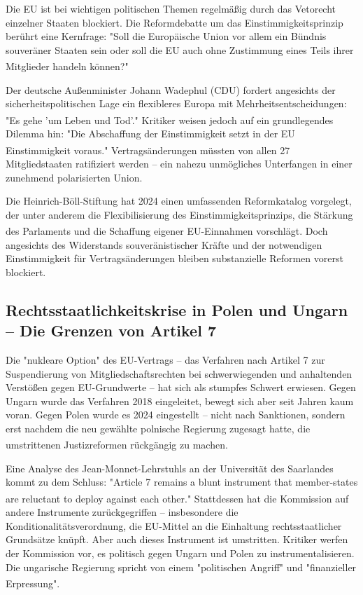 \documentclass[12pt,a4paper]{article}
\newcommand{\footcite}[1]{\textsuperscript{\cite{#1}}}
\begin{document}
	Die EU ist bei wichtigen politischen Themen regelmäßig durch das Vetorecht einzelner Staaten blockiert. Die Reformdebatte um das Einstimmigkeitsprinzip berührt eine Kernfrage: "Soll die Europäische Union vor allem ein Bündnis souveräner Staaten sein oder soll die EU auch ohne Zustimmung eines Teils ihrer Mitglieder handeln können?"\footcite{DLF2026}
	
	Der deutsche Außenminister Johann Wadephul (CDU) fordert angesichts der sicherheitspolitischen Lage ein flexibleres Europa mit Mehrheitsentscheidungen: "Es gehe 'um Leben und Tod'."\footcite{Wadephul2026} Kritiker weisen jedoch auf ein grundlegendes Dilemma hin: "Die Abschaffung der Einstimmigkeit setzt in der EU Einstimmigkeit voraus."\footcite{SZ2026} Vertragsänderungen müssten von allen 27 Mitgliedstaaten ratifiziert werden – ein nahezu unmögliches Unterfangen in einer zunehmend polarisierten Union.
	
	Die Heinrich-Böll-Stiftung hat 2024 einen umfassenden Reformkatalog vorgelegt, der unter anderem die Flexibilisierung des Einstimmigkeitsprinzips, die Stärkung des Parlaments und die Schaffung eigener EU-Einnahmen vorschlägt.\footcite{Boell2024} Doch angesichts des Widerstands souveränistischer Kräfte und der notwendigen Einstimmigkeit für Vertragsänderungen bleiben substanzielle Reformen vorerst blockiert.
	
	\subsection{Rechtsstaatlichkeitskrise in Polen und Ungarn – Die Grenzen von Artikel 7}
	
	Die "nukleare Option" des EU-Vertrags – das Verfahren nach Artikel 7 zur Suspendierung von Mitgliedschaftsrechten bei schwerwiegenden und anhaltenden Verstößen gegen EU-Grundwerte – hat sich als stumpfes Schwert erwiesen. Gegen Ungarn wurde das Verfahren 2018 eingeleitet, bewegt sich aber seit Jahren kaum voran. Gegen Polen wurde es 2024 eingestellt – nicht nach Sanktionen, sondern erst nachdem die neu gewählte polnische Regierung zugesagt hatte, die umstrittenen Justizreformen rückgängig zu machen.\footcite{Prema2025}
	
	Eine Analyse des Jean-Monnet-Lehrstuhls an der Universität des Saarlandes kommt zu dem Schluss: "Article 7 remains a blunt instrument that member-states are reluctant to deploy against each other."\footcite{Prema2025} Stattdessen hat die Kommission auf andere Instrumente zurückgegriffen – insbesondere die Konditionalitätsverordnung, die EU-Mittel an die Einhaltung rechtsstaatlicher Grundsätze knüpft. Aber auch dieses Instrument ist umstritten. Kritiker werfen der Kommission vor, es politisch gegen Ungarn und Polen zu instrumentalisieren. Die ungarische Regierung spricht von einem "politischen Angriff" und "finanzieller Erpressung".\footcite{Steger2025}
	
\end{document}
